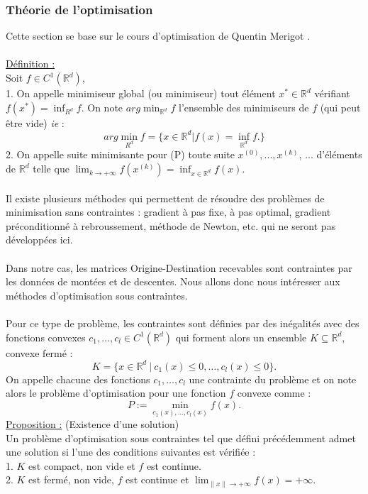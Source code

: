 \documentclass[12pt]{article}
\newcommand{\R}{\mathbb{R}}
\newcommand{\Rd}{\mathbb{R}^d}
\newcommand{\defin}{\underline{Définition :} }
\newcommand{\prop}{\underline{Proposition :} }
\begin{document}
\subsubsection{Théorie de l'optimisation}
\label{theorie optimisation}
Cette section se base sur le cours d'optimisation de Quentin Merigot \cite{poly_quentin_merigot}.\\
\\
\defin\\
Soit $f \in C^1(\Rd)$,\\
1. On appelle minimiseur global (ou minimiseur) tout élément $x^* \in \R^d$ vérifiant $f(x^*) = \inf_{R^d}f$. On note $arg \min_{\Rd} f$ l'ensemble des minimiseurs de $f$ (qui peut être vide) \textit{ie} : 
\[
arg \min_{R^d} f = \{ x \in \Rd | f(x) = \inf_{\Rd} f.\}
\]
2. On appelle suite minimisante pour (P) toute suite $x^{(0)}, ..., x^{(k)}$, ... d'éléments de $\Rd$ telle que $\lim_{k\to+\infty} f(x^{(k)}) = \inf_{x \in \Rd} f(x)$.\\
\\
Il existe plusieurs méthodes qui permettent de résoudre des problèmes de minimisation sans contraintes : gradient à pas fixe, à pas optimal, gradient préconditionné à rebroussement, méthode de Newton, etc. qui ne seront pas développées ici.\\
\\
Dans notre cas, les matrices Origine-Destination recevables sont contraintes par les données de montées et de descentes. Nous allons donc nous intéresser aux méthodes d'optimisation sous contraintes.\\
\\
Pour ce type de problème, les contraintes sont définies par des inégalités avec des fonctions convexes $c_1, \dots, c_l \in C^1(\Rd)$ qui forment alors un ensemble $K \subseteq \Rd$, convexe fermé : 
\[K = \{x \in \Rd \:|\: c_1(x) \leq 0, \dots, c_l(x) \leq 0 \}.\] 
On appelle chacune des fonctions $c_1, \dots, c_l$ une contrainte du problème et on note alors le problème d'optimisation pour une fonction $f$ convexe comme :
\[
P := \min_{c_1(x), \dots, c_l(x)} f(x).
\]
\prop (Existence d'une solution)\\
Un problème d'optimisation sous contraintes tel que défini précédemment admet une solution si l'une des conditions suivantes est vérifiée :\\
1. $K$ est compact, non vide et $f$ est continue.\\
2. $K$ est fermé, non vide, $f$ est continue et $\lim_{\lVert x\lVert \to +\infty} f(x) = +\infty.$\\
\end{document}

